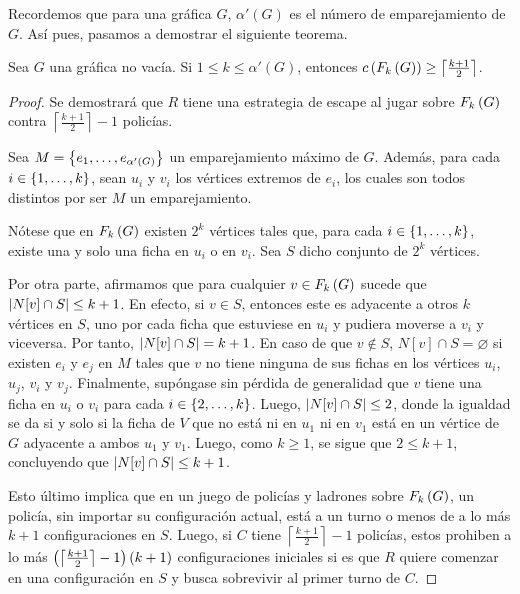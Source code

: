 Recordemos que para una gr\'afica $G$, $\alpha'(G)$ es el n\'umero de
emparejamiento de $G$. As\'i pues, pasamos a demostrar el siguiente teorema.

\begin{teorema}
\label{teo:cota-inf-emparejamiento}
    Sea $G$ una gr\'afica no vac\'ia. Si $1\leq k\leq \alpha'(G)$, entonces
    $c\left( F_{k}\left( G\right)\right) \geq \left\lceil\frac{k+1}{2}\right\rceil$.
\end{teorema}

\begin{proof}
    Se demostrar\'a que $R$ tiene una estrategia de escape al jugar sobre
    $F_{k}\left( G\right)$ contra $\left\lceil\frac{k+1}{2}\right\rceil - 1$ polic\'ias.

    Sea $M=\left\{ e_1,\dots,e_{\alpha'(G)}\right\}$ un emparejamiento m\'aximo de $G$.
    Adem\'as, para cada $i\in\{1,\dots, k\}$, sean $u_i$ y $v_i$ los v\'ertices
    extremos de $e_i$, los cuales son todos distintos por ser $M$ un
    emparejamiento.

    N\'otese que en $F_{k}\left( G\right)$ existen $2^{k}$ v\'ertices tales que, para cada
    $i\in\{1,\dots, k\}$, existe una y solo una ficha en $u_i$ o en $v_i$. Sea $S$
    dicho conjunto de $2^{k}$ v\'ertices.
    
    Por otra parte, afirmamos que para cualquier $v\in F_{k}\left( G\right)$ sucede que
    $\left|N[v]\cap S\right|\leq k+1$. En efecto, si $v\in S$, entonces este es
    adyacente a otros $k$ v\'ertices en $S$, uno por cada ficha que estuviese en
    $u_i$ y pudiera moverse a $v_i$ y viceversa. Por tanto, $\left|N[v]\cap
    S\right|=k+1$. En caso de que $v\notin S$, $N[v]\cap S=\varnothing$ si existen
    $e_i$ y $e_j$ en $M$ tales que $v$ no tiene ninguna de sus fichas en los
    v\'ertices $u_i$, $u_j$, $v_i$ y $v_j$. Finalmente, sup\'ongase sin
    p\'erdida de generalidad que $v$ tiene una ficha en $u_i$ o $v_i$ para cada
    $i\in\{2,\dots, k\}$. Luego, $\left|N[v]\cap S\right|\leq 2$, donde la igualdad se da
    si y solo si la ficha de $V$ que no est\'a ni en $u_1$ ni en $v_1$ est\'a en
    un v\'ertice de $G$ adyacente a ambos $u_1$ y $v_1$. Luego, como $k\geq 1$,
    se sigue que $2\leq k+1$, concluyendo que $\left|N[v]\cap S\right|\leq k+1$.

    Esto \'ultimo implica que en un juego de polic\'ias y ladrones sobre
    $F_{k}\left( G\right)$, un polic\'ia, sin importar su configuraci\'on actual, est\'a a
    un turno o menos de a lo m\'as $k+1$ configuraciones en $S$. Luego, si $C$
    tiene $\left\lceil\frac{k+1}{2}\right\rceil - 1$ polic\'ias, estos prohiben
    a lo m\'as $\left( \left\lceil\frac{k+1}{2}\right\rceil - 1\right)\left( k+1\right)$
    configuraciones iniciales si es que $R$ quiere comenzar en una
    configuraci\'on en $S$ y busca sobrevivir al primer turno de $C$.
    

\end{proof}
